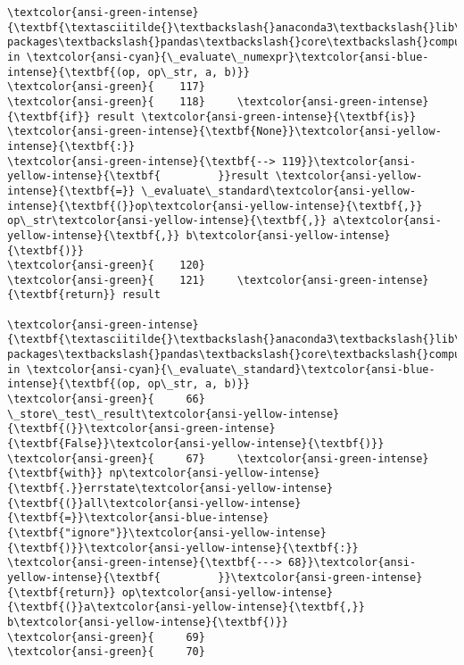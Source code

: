 \documentclass[11pt]{article}
\begin{document}
\begin{Verbatim}[commandchars=\\\{\}, frame=single, framerule=2mm, rulecolor=\color{outerrorbackground}]
\textcolor{ansi-green-intense}{\textbf{\textasciitilde{}\textbackslash{}anaconda3\textbackslash{}lib\textbackslash{}site-packages\textbackslash{}pandas\textbackslash{}core\textbackslash{}computation\textbackslash{}expressions.py}} in \textcolor{ansi-cyan}{\_evaluate\_numexpr}\textcolor{ansi-blue-intense}{\textbf{(op, op\_str, a, b)}}
\textcolor{ansi-green}{    117} 
\textcolor{ansi-green}{    118}     \textcolor{ansi-green-intense}{\textbf{if}} result \textcolor{ansi-green-intense}{\textbf{is}} \textcolor{ansi-green-intense}{\textbf{None}}\textcolor{ansi-yellow-intense}{\textbf{:}}
\textcolor{ansi-green-intense}{\textbf{--> 119}}\textcolor{ansi-yellow-intense}{\textbf{         }}result \textcolor{ansi-yellow-intense}{\textbf{=}} \_evaluate\_standard\textcolor{ansi-yellow-intense}{\textbf{(}}op\textcolor{ansi-yellow-intense}{\textbf{,}} op\_str\textcolor{ansi-yellow-intense}{\textbf{,}} a\textcolor{ansi-yellow-intense}{\textbf{,}} b\textcolor{ansi-yellow-intense}{\textbf{)}}
\textcolor{ansi-green}{    120} 
\textcolor{ansi-green}{    121}     \textcolor{ansi-green-intense}{\textbf{return}} result

\textcolor{ansi-green-intense}{\textbf{\textasciitilde{}\textbackslash{}anaconda3\textbackslash{}lib\textbackslash{}site-packages\textbackslash{}pandas\textbackslash{}core\textbackslash{}computation\textbackslash{}expressions.py}} in \textcolor{ansi-cyan}{\_evaluate\_standard}\textcolor{ansi-blue-intense}{\textbf{(op, op\_str, a, b)}}
\textcolor{ansi-green}{     66}         \_store\_test\_result\textcolor{ansi-yellow-intense}{\textbf{(}}\textcolor{ansi-green-intense}{\textbf{False}}\textcolor{ansi-yellow-intense}{\textbf{)}}
\textcolor{ansi-green}{     67}     \textcolor{ansi-green-intense}{\textbf{with}} np\textcolor{ansi-yellow-intense}{\textbf{.}}errstate\textcolor{ansi-yellow-intense}{\textbf{(}}all\textcolor{ansi-yellow-intense}{\textbf{=}}\textcolor{ansi-blue-intense}{\textbf{"ignore"}}\textcolor{ansi-yellow-intense}{\textbf{)}}\textcolor{ansi-yellow-intense}{\textbf{:}}
\textcolor{ansi-green-intense}{\textbf{---> 68}}\textcolor{ansi-yellow-intense}{\textbf{         }}\textcolor{ansi-green-intense}{\textbf{return}} op\textcolor{ansi-yellow-intense}{\textbf{(}}a\textcolor{ansi-yellow-intense}{\textbf{,}} b\textcolor{ansi-yellow-intense}{\textbf{)}}
\textcolor{ansi-green}{     69} 
\textcolor{ansi-green}{     70} 


\end{Verbatim}
\end{document}
